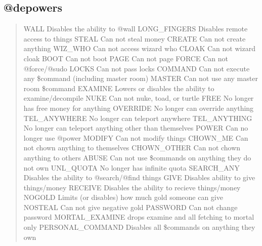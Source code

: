 \documentclass[letterpaper,10pt,english]{sphinxmanual}
\begin{document}
\subsection{@depowers}
\label{\detokenize{security:depowers}}\begin{quote}

\sphinxAtStartPar
WALL               \sphinxhyphen{} Disables the ability to @wall
LONG\_FINGERS       \sphinxhyphen{} Disables remote access to things
STEAL              \sphinxhyphen{} Can not steal money
CREATE             \sphinxhyphen{} Can not create anything
WIZ\_WHO            \sphinxhyphen{} Can not access wizard who
CLOAK              \sphinxhyphen{} Can not wizard cloak
BOOT               \sphinxhyphen{} Can not boot
PAGE               \sphinxhyphen{} Can not page
FORCE              \sphinxhyphen{} Can not @force/@sudo
LOCKS              \sphinxhyphen{} Can not pass locks
COMMAND            \sphinxhyphen{} Can not execute any \$command (including master room)
MASTER             \sphinxhyphen{} Can not use any master room \$command
EXAMINE            \sphinxhyphen{} Lowers or disables the ability to examine/decompile
NUKE               \sphinxhyphen{} Can not nuke, toad, or turtle
FREE               \sphinxhyphen{} No longer has free money for anything
OVERRIDE           \sphinxhyphen{} No longer can override anything
TEL\_ANYWHERE       \sphinxhyphen{} No longer can teleport anywhere
TEL\_ANYTHING       \sphinxhyphen{} No longer can teleport anything other than themselves
POWER              \sphinxhyphen{} Can no longer use @power
MODIFY             \sphinxhyphen{} Can not modify things
CHOWN\_ME           \sphinxhyphen{} Can not chown anything to themselves
CHOWN\_OTHER        \sphinxhyphen{} Can not chown anything to others
ABUSE              \sphinxhyphen{} Can not use \$commands on anything they do not own
UNL\_QUOTA          \sphinxhyphen{} No longer has infinite quota
SEARCH\_ANY         \sphinxhyphen{} Disables the ability to @search/@find things
GIVE               \sphinxhyphen{} Disables ability to give things/money
RECEIVE            \sphinxhyphen{} Disables the ability to recieve things/money
NOGOLD             \sphinxhyphen{} Limits (or disables) how much gold someone can give
NOSTEAL            \sphinxhyphen{} Can not give negative gold
PASSWORD           \sphinxhyphen{} Can not change password
MORTAL\_EXAMINE     \sphinxhyphen{} drops examine and all fetching to mortal only
PERSONAL\_COMMAND   \sphinxhyphen{} Disables all \$commands on anything they own
\end{quote}
\end{document}
